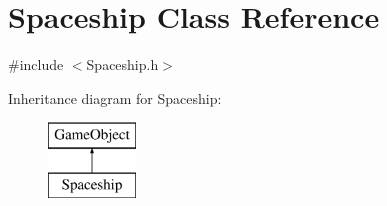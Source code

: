 \hypertarget{class_spaceship}{}\section{Spaceship Class Reference}
\label{class_spaceship}


{\ttfamily \#include $<$Spaceship.\+h$>$}

Inheritance diagram for Spaceship\+:\begin{figure}[H]
\begin{center}
\leavevmode
\includegraphics[height=2.000000cm]{class_spaceship}
\end{center}
\end{figure}
